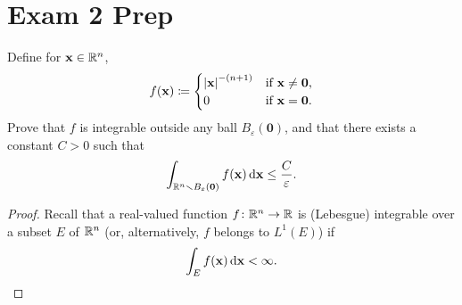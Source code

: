 \section{Exam 2 Prep}
\begin{problem}
Define for $\mathbf{x}\in\mathbb{R}^n$,
\[
f(\mathbf{x})\coloneqq
\begin{cases}
\left|\mathbf{x}\right|^{-(n+1)}&\text{if $\mathbf{x}\neq \mathbf{0}$,}\\
0&\text{if $\mathbf{x}=\mathbf{0}$.}
\end{cases}
\]
Prove that $f$ is integrable outside any ball $B_\varepsilon(\mathbf{0})$,
and that there exists a constant $C>0$ such that
\[
\int_{\mathbb{R}^n\smallsetminus B_\varepsilon(\mathbf{0})}f(\mathbf{x})\mathop{}\!\mathrm{d}\mathbf{x}\leq\frac{C}{\varepsilon}.
\]
\end{problem}
\begin{proof}
Recall that a real-valued function $f\colon\mathbb{R}^n\to\mathbb{R}$ is (Lebesgue)
integrable over a subset $E$ of $\mathbb{R}^n$ (or, alternatively, $f$ belongs to
$L^1(E)$) if
\[
\int_E f(\mathbf{x})\mathop{}\!\mathrm{d}\mathbf{x}<\infty.
\]


\end{proof}
